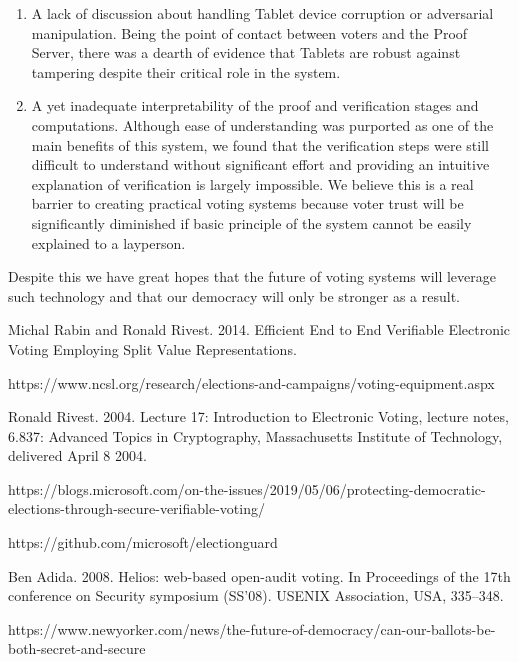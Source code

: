 \documentclass{article}
\begin{document}
\begin{enumerate}
\item
    A lack of discussion about handling Tablet device corruption or adversarial manipulation. Being the point of contact between voters and the Proof Server, there was a dearth of evidence that Tablets are robust against tampering despite their critical role in the system.
\item
    A yet inadequate interpretability of the proof and verification stages and computations. Although ease of understanding was purported as one of the main benefits of this system, we found that the verification steps were still difficult to understand without significant effort and providing an intuitive explanation of verification is largely impossible. We believe this is a real barrier to creating practical voting systems because voter trust will be significantly diminished if basic principle of the system cannot be easily explained to a layperson.
\end{enumerate}

Despite this we have great hopes that the future of voting systems will leverage such technology and that our democracy will only be stronger as a result.

\begin{thebibliography}{7}

Michal Rabin and Ronald Rivest. 2014. Efficient End to End Verifiable Electronic Voting Employing Split Value Representations.

https://www.ncsl.org/research/elections-and-campaigns/voting-equipment.aspx

Ronald Rivest. 2004. Lecture 17: Introduction to Electronic Voting, lecture notes, 6.837: Advanced Topics in Cryptography, Massachusetts Institute of Technology, delivered April 8 2004.

https://blogs.microsoft.com/on-the-issues/2019/05/06/protecting-democratic-elections-through-secure-verifiable-voting/

https://github.com/microsoft/electionguard

Ben Adida. 2008. Helios: web-based open-audit voting. In Proceedings of the 17th conference on Security symposium (SS'08). USENIX Association, USA, 335–348.

https://www.newyorker.com/news/the-future-of-democracy/can-our-ballots-be-both-secret-and-secure


\end{thebibliography}
\end{document}
